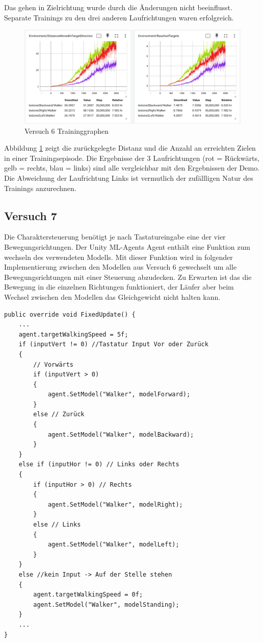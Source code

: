 Das gehen in Zielrichtung wurde durch die Änderungen nicht beeinflusst. Separate Trainings zu den drei anderen Laufrichtungen waren erfolgreich.

\begin{figure}[H]
  \centering  
  \includegraphics[scale=0.5]{img/versuch6_training.png}
  \caption{Versuch 6 Traininggraphen}
  \label{fig:versuch6_training}
\end{figure}

Abbildung \ref{fig:versuch6_training} zeigt die zurückgelegte Distanz und die Anzahl an erreichten Zielen in einer Trainingsepisode. Die Ergebnisse der 3 Laufrichtungen (rot = Rückwärts, gelb = rechts, blau = links) sind alle vergleichbar mit den Ergebnissen der Demo. Die Abweichung der Laufrichtung Links ist vermutlich der zufällligen Natur des Trainings anzurechnen.

\subsection{Versuch 7}
Die Charaktersteuerung benötigt je nach Tastatureingabe eine der vier Bewegungsrichtungen. Der Unity ML-Agents Agent enthält eine Funktion zum wechseln des verwendeten Modells. Mit dieser Funktion wird in folgender Implementierung zwischen den Modellen aus Versuch 6 gewechselt um alle Bewegungsrichtungen mit einer Steuerung abzudecken. Zu Erwarten ist das die Bewegung in die einzelnen Richtungen funktioniert, der Läufer aber beim Wechsel zwischen den Modellen das Gleichgewicht nicht halten kann.

\begin{lstlisting}[caption={Laufrichtung Modell wechseln},captionpos=b,label={lst:laufrichtung_modell_wechsel}]
public override void FixedUpdate() {
    ...    
    agent.targetWalkingSpeed = 5f;
    if (inputVert != 0) //Tastatur Input Vor oder Zurück
    {
        // Vorwärts
        if (inputVert > 0)
        {
            agent.SetModel("Walker", modelForward);
        }
        else // Zurück
        {
            agent.SetModel("Walker", modelBackward);
        }
    }
    else if (inputHor != 0) // Links oder Rechts
    {
        if (inputHor > 0) // Rechts
        {
            agent.SetModel("Walker", modelRight);
        }
        else // Links
        {
            agent.SetModel("Walker", modelLeft);
        }
    }
    else //kein Input -> Auf der Stelle stehen
    {
        agent.targetWalkingSpeed = 0f;
        agent.SetModel("Walker", modelStanding);
    }
    ...
}
\end{lstlisting}

